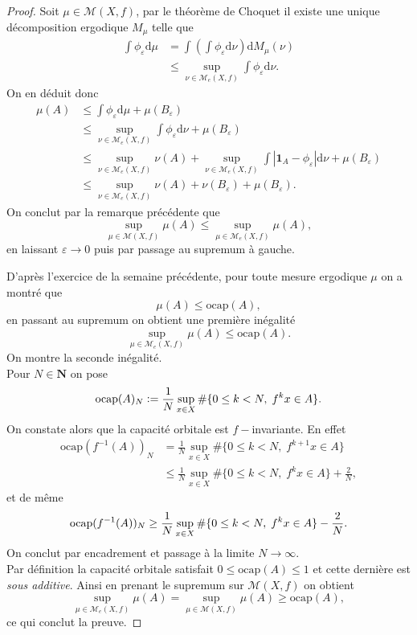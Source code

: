 \documentclass[12pt]{article}
\newcommand{\defeq}{\vcentcolon=}
\newcommand{\N}{\mathbf{N}}
\newcommand{\de}{\mathrm{d}}
\begin{document}
\begin{proof}
Soit $\mu \in \mathcal{M}(X,f)$, par le théorème de Choquet il existe une unique décomposition ergodique $M_{\mu}$ telle que
\begin{align*}
        \int\phi_{\varepsilon}\de\mu &= \int(\int\phi_{\varepsilon}\de\nu)\de M_{\mu}(\nu) \\
                                     &\le \sup_{\nu \in \mathcal{M}_{e}(X,f)}\int\phi_{\varepsilon}\de\nu 
.\end{align*}
On en déduit donc 
\begin{align*}
        \mu(A) &\le \int\phi_{\varepsilon}\de\mu + \mu(B_{\varepsilon}) \\
               &\le \sup_{\nu \in \mathcal{M}_{e}(X,f)}\int\phi_{\varepsilon}\de\nu + \mu(B_{\varepsilon})\\
               &\le \sup_{\nu \in \mathcal{M}_{e}(X,f)}\nu(A) + \sup_{\nu \in \mathcal{M}_{e}(X,f)}\int|\mathbf{1}_{A}-\phi_{\varepsilon}|\de\nu + \mu(B_{\varepsilon})\\
               &\le \sup_{\nu \in \mathcal{M}_{e}(X,f)}\nu(A) + \nu(B_{\varepsilon}) + \mu(B_{\varepsilon})
.\end{align*}
On conclut par la remarque précédente que \[
\sup_{\mu \in \mathcal{M}(X,f)}\mu(A) \le \sup_{\mu \in \mathcal{M}_{e}(X,f)}\mu(A) 
,\] en laissant $\varepsilon \to 0$ puis par passage au supremum à gauche. 

\medskip

D'après l'exercice de la semaine précédente, pour toute mesure ergodique $\mu$ on a montré que \[
        \mu(A) \le \mathrm{ocap}(A)
,\] en passant au supremum on obtient une première inégalité \[
\sup_{\mu \in \mathcal{M}_{e}(X,f)} \mu(A) \le \mathrm{ocap}(A)
.\] On montre la seconde inégalité. \\

Pour $N \in \N$ on pose \[
\mathrm{ocap}(A)_{N} \defeq \frac{1}{N}\sup_{x\in X}\#\{0 \le k < N, \; f^{k}x \in A\} 
.\] 
On constate alors que la capacité orbitale est $f-$invariante. En effet 
\begin{align*}
        \mathrm{ocap}(f^{-1}(A))_{N} &= \frac{1}{N}\sup_{x\in X}\#\{0 \le k < N, \; f^{k+1}x \in A\} \\
                                     &\le \frac{1}{N}\sup_{x\in X}\#\{0 \le k < N, \; f^{k}x \in A\} + \frac{2}{N} 
,\end{align*} et de même \[
        \mathrm{ocap}(f^{-1}(A))_{N} \ge \frac{1}{N}\sup_{x\in X}\#\{0 \le k < N, \; f^{k}x \in A\} - \frac{2}{N} \\
.\] On conclut par encadrement et passage à la limite $N \to \infty$. \\

Par définition la capacité orbitale satisfait $0 \le \mathrm{ocap}(A) \le 1$ et cette dernière est \emph{sous additive}. Ainsi en prenant le supremum sur $\mathcal{M}(X,f)$ on obtient 
\[
        \sup_{\mu \in \mathcal{M}_{e}(X,f)}\mu(A) = \sup_{\mu \in \mathcal{M}(X,f)}\mu(A) \ge \mathrm{ocap}(A)
,\] ce qui conclut la preuve.
\end{proof}
\end{document}
